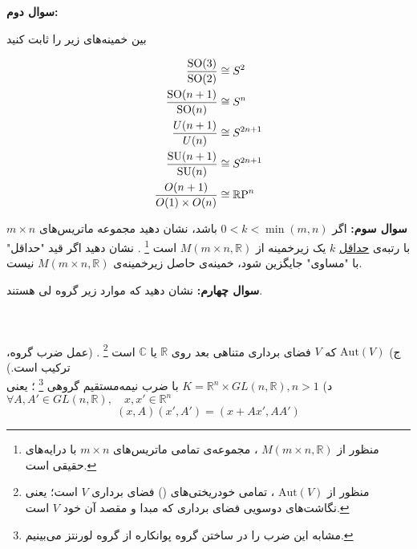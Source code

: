 \documentclass{article}
\begin{document}
	
	\vspace{-1em}
	\endline
	
	\vspace{-1em}
	\textbf{سوال دوم:}
	
	 بین خمینه‌های زیر را ثابت کنید
	 
	\begin{equation*}
		\begin{aligned}
			\frac{\text{SO}(3)}{\text{SO}(2)} &\cong S^2 \\
			\vspace{-1em}
			\frac{\text{SO}(n+1)}{\text{SO}(n)} &\cong S^n\\
			\frac{U(n+1)}{U(n)} &\cong S^{2n+1}\\
			\frac{\text{SU}(n+1)}{\text{SU}(n)} &\cong S^{2n+1}\\
			\frac{O(n+1)}{O(1)\times O(n)}	&\cong \mathbb{R}\text{P}^n\\
		\end{aligned}
	\end{equation*}
	\vspace{-1em}
	\endline
	
	\vspace{-2em}
	\noindent
	\textbf{سوال سوم:}
اگر 
$0<k< \min(m,n)$
باشد، نشان دهید مجموعه ماتریس‌های 
$m\times n$
با رتبه‌ی \underline{حداقل} 
$k$
 یک زیرخمینه از 
$M(m\times n , \mathbb{R})$
است
\footnote{منظور از 
$M(m\times n , \mathbb{R})$
، مجموعه‌ی تمامی ماتریس‌های 
$m\times n$ 
با درایه‌های حقیقی است.
}
.  نشان دهید اگر قید "حداقل" با "مساوی" جایگزین شود، خمینه‌ی حاصل    زیرخمینه‌ی
$M(m\times n , \mathbb{R})$
نیست.
	
	\vspace{-1em}
	\endline
	
	\noindent
	\textbf{سوال چهارم:}
	 نشان دهید که موارد زیر گروه لی هستند. 
	  
	  \noindent
	\\
	\noindent
	\\
	ج) 
		$\text{Aut}(V)$
		 که $V$ فضای برداری متناهی بعد روی
		 $\mathbb{R}$
		 یا
		 $\mathbb{C}$
		 است
		 		 \footnote{
		 	منظور از 
		 	$\text{Aut}(V)$
		 	، تمامی خودریختی‌های
		 	()
		 	فضای برداری $V$ است؛ یعنی نگاشت‌های دوسویی فضای برداری که مبدا و مقصد آن خود 
		 	$V$ است.
		 }
		 . (عمل ضرب گروه، ترکیب است.)\\
	د) 
		$
			K = \mathbb{R}^n \times GL(n,\mathbb{R}) , n>1
		$
		با ضرب نیمه‌مستقیم گروهی
		\footnote{مشابه این ضرب را در ساختن گروه پوانکاره از گروه لورنتز می‌بینیم.}
		؛ یعنی 
		$\forall A,A' \in  GL(n,\mathbb{R}), \quad x,x'\in \mathbb{R}^n$ 
		\[
			(x,A)(x',A')= (x+Ax',AA') 
		\]
	
\end{document}
